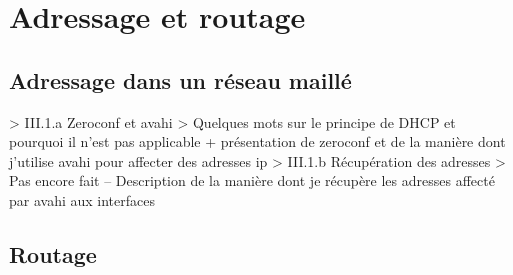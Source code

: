 \chapter{Adressage et routage}
\section{Adressage dans un réseau maillé}
> III.1.a Zeroconf et avahi
>         Quelques mots sur le principe de DHCP et pourquoi il n'est pas applicable + présentation de zeroconf et de la manière dont j'utilise avahi pour affecter des adresses ip
> III.1.b Récupération des adresses
>         Pas encore fait -- Description de la manière dont je récupère les adresses affecté par avahi aux interfaces
\section{Routage}